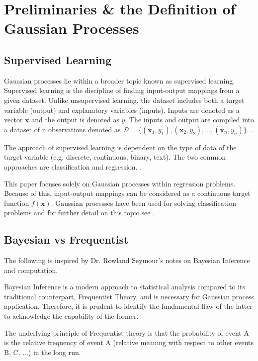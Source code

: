\documentclass[12pt,a4paper]{article}
\begin{document}
\newpage
\section{Preliminaries \& the Definition of Gaussian Processes}
\label{sec:prelim}
\subsection{Supervised Learning}

Gaussian processes lie within a broader topic known as supervised learning. Supervised learning is the discipline of finding input-output mappings from a given dataset. Unlike unsupervised learning, the dataset includes both a target variable (output) and explanatory variables (inputs). Inputs are denoted as a vector \(\bm{\mathbf{x}}\) and the output is denoted as \(y\). The inputs and output are compiled into a dataset of n observations denoted as \(\mathcal{D} = \{(\bm{\mathbf{x}}_1, y_1),(\bm{\mathbf{x}}_2,y_2), \dots,(\bm{\mathbf{x}}_n,y_n)\}\). \citep{williams2006gaussian}. 

The approach of supervised learning is dependent on the type of data of the target variable (e.g. discrete, continuous, binary, text). The two common approaches are classification and regression. \citep{abu2012learning}.

This paper focuses solely on Gaussian processes within regression problems. Because of this, input-output mappings can be considered as a continuous target function \(f(\bm{\mathbf{x}})\). Gaussian processes have been used for solving classification problems and for further detail on this topic see \citet{williams2006gaussian}. 

\subsection{Bayesian vs Frequentist}
\label{sec:Freq}

The following is inspired by Dr. Rowland Seymour's notes on Bayesian Inference and computation. \citep{seymour2023BayesianInference}

Bayesian Inference is a modern approach to statistical analysis compared to its traditional counterpart, Frequentist Theory, and is necessary for Gaussian process application. Therefore, it is prudent to identify the fundamental flaw of the latter to acknowledge the capability of the former.

The underlying principle of Frequentist theory is that the probability of event A is the relative frequency of event A (relative meaning with respect to other events B, C, ...) in the long run.
\end{document}
